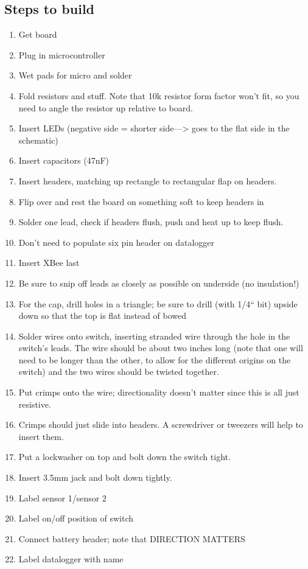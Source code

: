 \documentclass{article}
\begin{document}
\subsection{Steps to build}

\begin{enumerate}
\item Get board
\item Plug in microcontroller
\item Wet pads for micro and solder
\item Fold resistors and stuff.  Note that 10k resistor form factor won't fit, so you need to angle the resistor up relative to board.
\item Insert LEDs (negative side = shorter side---\textgreater{} goes to the flat side in the schematic)
\item Insert capacitors (47nF)
\item Insert headers, matching up rectangle to rectangular flap on headers.
\item Flip over and rest the board on something soft to keep headers in
\item Solder one lead, check if headers flush, push and heat up to keep flush.
\item Don't need to populate six pin header on datalogger
\item Insert XBee last
\item Be sure to snip off leads as closely as possible on underside (no insulation!)
\item For the cap, drill holes in a triangle; be sure to drill (with 1/4`` bit) upside down so that the top is flat instead of bowed
\item Solder wires onto switch, inserting stranded wire through the hole in the switch's leads.  The wire should be about two inches long (note that one will need to be longer than the other, to allow for the different origins on the switch) and the two wires should be twisted together.
\item Put crimps onto the wire; directionality doesn't matter since this is all just resistive.
\item Crimps should just slide into headers.  A screwdriver or tweezers will help to insert them.
\item Put a lockwasher on top and bolt down the switch tight.
\item Insert 3.5mm jack and bolt down tightly.
\item Label sensor 1/sensor 2
\item Label on/off position of switch
\item Connect battery header; note that DIRECTION MATTERS
\item Label datalogger with name
\end{enumerate}
\end{document}

